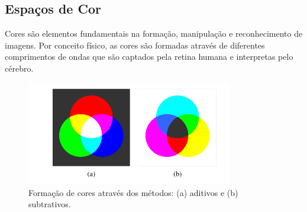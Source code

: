 \subsection{Espaços de Cor}
Cores são elementos fundamentais na formação, manipulação e reconhecimento de imagens. Por conceito físico, as cores são formadas através de diferentes comprimentos de ondas que são captados pela retina humana e interpretas pelo cérebro.\par
\begin{figure}[ht]
    \centering
    \includegraphics[width=0.8\textwidth]{capitulos/cores_adtivas_subtrativas.png}
    \caption{Formação de cores através dos métodos: (a) aditivos e (b) subtrativos.\cite{szeliski2021computer}}
    \label{fig:cores_adtivas_subtrativas}
\end{figure}
    

